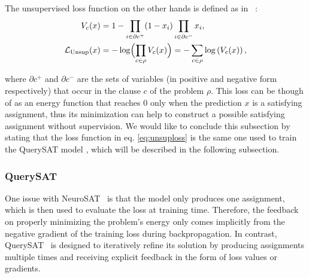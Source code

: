 \documentclass{article}
\begin{document}
The unsupervised loss function on the other hands is defined as in ~\cite{ozolins2022goal}:
\begin{equation}
\label{eq:unsuploss}
\begin{aligned}
    V_c(x) &= 1 - \prod_{i\in \partial c^{+}}(1-x_i)\prod_{i\in \partial c^{-}}x_i, \hfill \\
    \mathcal{L}_{\text{Unsup}}(x) &= -\log\Bigl(\prod_{c\in\rho}V_c(x)\Bigr) = - \sum_{c \in \rho} \log \left(V_c(x)\right),
\end{aligned}
\end{equation}

where $\partial c^{+}$ and $\partial c^{-}$ are the sets of variables (in positive and negative form respectively) that occur in the clause $c$ of the problem $\rho$. This loss can be though of as an energy function that reaches $0$ only when the prediction $x$ is a satisfying assignment, thus its minimization can help to construct a possible satisfying assignment without supervision. We would like to conclude this subsection by stating that the loss function in eq. \eqref{eq:unsuploss} is the same one used to train the QuerySAT model \cite{ozolins2022goal}, which will be described in the following subsection.

\subsubsection{QuerySAT}
One issue with NeuroSAT~\cite{Selsam2019} is that the model only produces one assignment, which is then used to evaluate the loss at training time. Therefore, the feedback on properly minimizing the problem's energy only comes implicitly from the negative gradient of the training loss during backpropagation. In contrast, QuerySAT~\cite{ozolins2022goal} is designed to iteratively refine its solution by producing assignments multiple times and receiving explicit feedback in the form of loss values or gradients.
\end{document}
